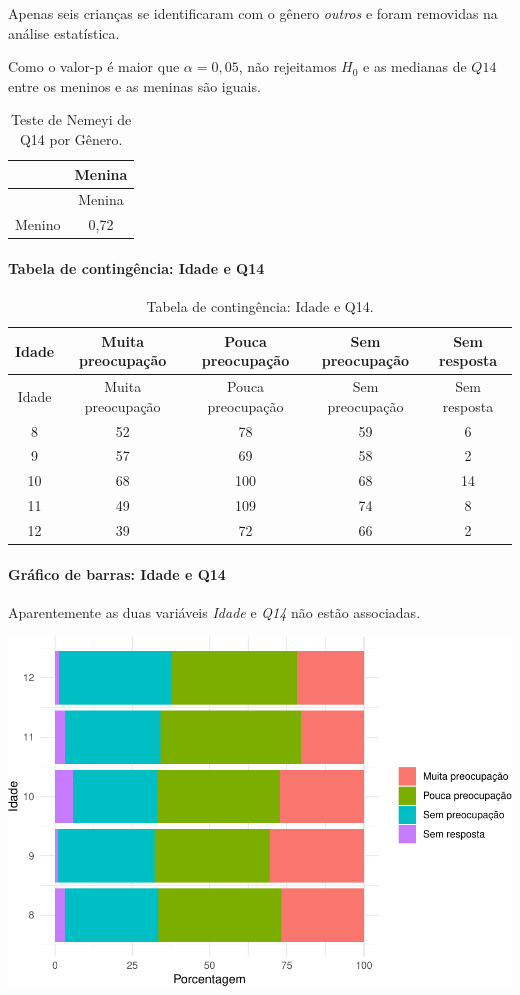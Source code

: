 \documentclass[]{article}
\let\oldparagraph\paragraph
\renewcommand{\paragraph}[1]{\oldparagraph{#1}\mbox{}}
\begin{document}
Apenas seis crianças se identificaram com o gênero \emph{outros} e foram removidas na análise estatística.

Como o valor-p é maior que \(\alpha=0,05\), não rejeitamos \(H_0\) e as medianas de \(Q14\) entre os meninos e as meninas são iguais.

\begin{longtable}[]{@{}lc@{}}
\caption{\label{tab:unnamed-chunk-73}Teste de Nemeyi de Q14 por Gênero.}\tabularnewline
\toprule
& Menina\tabularnewline
\midrule
\endfirsthead
\toprule
& Menina\tabularnewline
\midrule
\endhead
Menino & 0,72\tabularnewline
\bottomrule
\end{longtable}

\cleardoublepage

\hypertarget{tabela-de-continguxeancia-idade-e-q14}{%
\paragraph{Tabela de contingência: Idade e Q14}\label{tabela-de-continguxeancia-idade-e-q14}}

\begin{longtable}[]{@{}ccccc@{}}
\caption{\label{tab:unnamed-chunk-74}Tabela de contingência: Idade e Q14.}\tabularnewline
\toprule
Idade & Muita preocupação & Pouca preocupação & Sem preocupação & Sem resposta\tabularnewline
\midrule
\endfirsthead
\toprule
Idade & Muita preocupação & Pouca preocupação & Sem preocupação & Sem resposta\tabularnewline
\midrule
\endhead
8 & 52 & 78 & 59 & 6\tabularnewline
9 & 57 & 69 & 58 & 2\tabularnewline
10 & 68 & 100 & 68 & 14\tabularnewline
11 & 49 & 109 & 74 & 8\tabularnewline
12 & 39 & 72 & 66 & 2\tabularnewline
\bottomrule
\end{longtable}

\hypertarget{gruxe1fico-de-barras-idade-e-q14}{%
\paragraph{Gráfico de barras: Idade e Q14}\label{gruxe1fico-de-barras-idade-e-q14}}

Aparentemente as duas variáveis \emph{Idade} e \emph{Q14} não estão associadas.

\begin{center}\includegraphics[width=0.75\linewidth]{relatorio_files/figure-latex/unnamed-chunk-75-1} \end{center}
\end{document}
